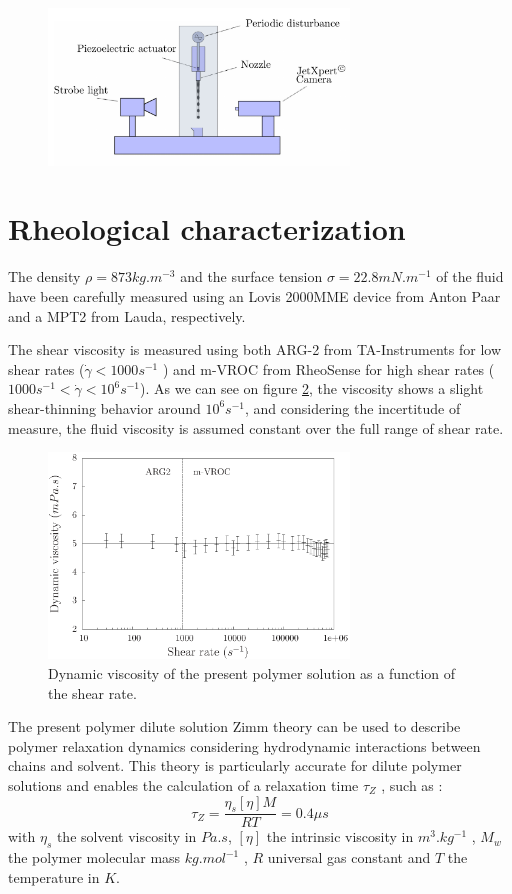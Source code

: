 \documentclass[twocolumn,10pt]{asme2ej}
\begin{document}
\begin{figure}[H]
    \centering
    \includegraphics[width=8cm]{device.png}
    \caption{}
    \label{device}
\end{figure}


\section{Rheological characterization}

The density $\rho = 873 kg.m^{−3}$ and the surface tension $\sigma = 22.8 mN.m^{-1}$ of the fluid have been carefully measured using an Lovis 2000MME device from Anton Paar and a MPT2 from Lauda, respectively. 

The shear viscosity is measured using both ARG-2 from TA-Instruments for low shear rates ($\dot{\gamma} < 1000 s^{−1}$ ) and m-VROC from RheoSense for high shear rates ($1000 s^{−1}<\dot{\gamma} < 10^6 s^{−1}$). As we can see on figure \ref{beahaviorLaw}, the viscosity shows a slight shear-thinning behavior around $10^6s^{-1}$, and considering the incertitude of measure, the fluid viscosity is assumed constant over the full range of shear rate.

\begin{figure}[H]
    \centering
    \includegraphics[width=8cm]{./9651visco.eps}
    \caption{Dynamic viscosity of the present polymer solution as a function of the shear rate.}
    \label{beahaviorLaw}
\end{figure}

The present polymer dilute solution  Zimm theory can be used to describe polymer relaxation dynamics considering hydrodynamic interactions between chains and solvent. This theory is particularly accurate for dilute polymer solutions and enables the calculation of a relaxation time $\tau_Z$ , such as :
\begin{equation}
    \tau_Z = \frac{\eta_s [\eta] M}{RT} = 0.4 \mu s
    \label{zimm} 
\end{equation}
with $\eta_s$ the solvent viscosity in $Pa.s$, $[\eta]$ the intrinsic viscosity in $m^3.kg^{−1}$ , $M_w$ the
polymer molecular mass $kg.mol^{−1}$ , $R$ universal gas constant and $T$ the temperature in $K$.
\end{document}

